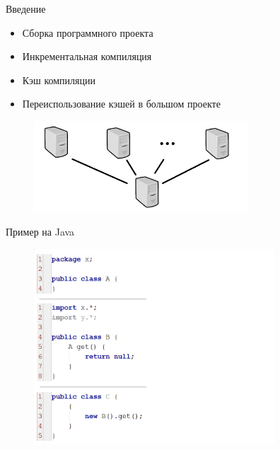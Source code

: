 

% 




{
	\begin{frame}
		\titlepage
	\end{frame}
}
\addtocounter{framenumber}{-1}

\begin{frame}{Введение}
\begin{itemize}
	\item Сборка программного проекта
	\item Инкрементальная компиляция
	\item Кэш компиляции
	\item Переиспользование кэшей в большом проекте
\end{itemize}
\begin{figure}[!h]
	\begin{center}
		\includegraphics[width=80mm]{network.png}
	\end{center}
\end{figure}
\end{frame}

\begin{frame}{Пример на Java}
\begin{figure}[!h]
	\centering
	\includegraphics[width=90mm]{state1.png}
\end{figure}
\end{frame}

